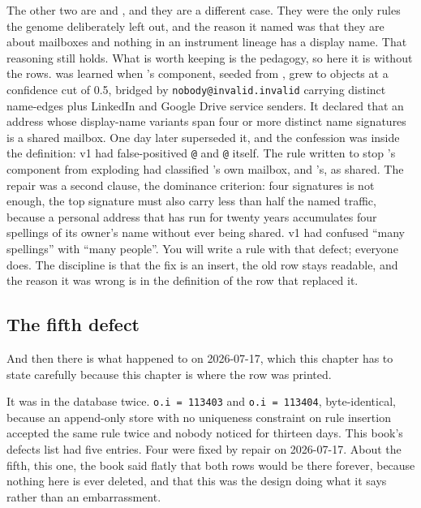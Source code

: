 The other two are  and , and they are a different case. They were the only rules the genome deliberately left out, and the reason it named was that they are about mailboxes and nothing in an instrument lineage has a display name. That reasoning still holds. What is worth keeping is the pedagogy, so here it is without the rows.  was learned when \labColleague's component, seeded from \texttt{\labEmail}, grew to \labColleagueComponentSize{} objects at a confidence cut of 0.5, bridged by \texttt{nobody@invalid.invalid} carrying \labColleagueNameEdges{} distinct name-edges plus LinkedIn and Google Drive service senders. It declared that an address whose display-name variants span four or more distinct name signatures is a shared mailbox. One day later  superseded it, and the confession was inside the definition: v1 had false-positived \texttt{\labEmail{}@\labMailDomain} and \texttt{\labPIHandle{}@\labMailDomain} itself. The rule written to stop \labColleague's component from exploding had classified \labColleague's own mailbox, and \labPI's, as shared. The repair was a second clause, the dominance criterion: four signatures is not enough, the top signature must also carry less than half the named traffic, because a personal address that has run for twenty years accumulates four spellings of its owner's name without ever being shared. v1 had confused ``many spellings'' with ``many people''. You will write a rule with that defect; everyone does. The discipline is that the fix is an insert, the old row stays readable, and the reason it was wrong is in the definition of the row that replaced it.

\subsection{The fifth defect}

And then there is what happened to  on 2026-07-17, which this chapter has to state carefully because this chapter is where the row was printed.

It was in the database twice. \texttt{o.i = 113403} and \texttt{o.i = 113404}, byte-identical, because an append-only store with no uniqueness constraint on rule insertion accepted the same rule twice and nobody noticed for thirteen days. This book's defects list had five entries. Four were fixed by repair on 2026-07-17. About the fifth, this one, the book said flatly that both rows would be there forever, because nothing here is ever deleted, and that this was the design doing what it says rather than an embarrassment.

